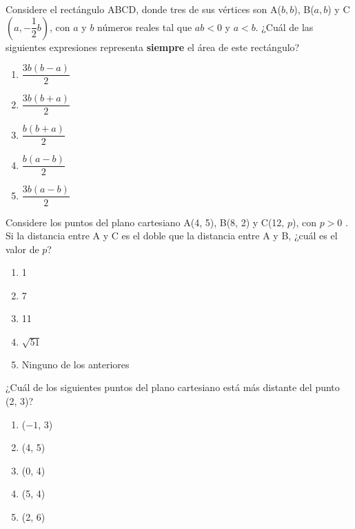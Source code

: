 \begin{enumerate}[label=\large{\textbf{\arabic*.}}, itemsep = 0.15cm, topsep = 0.5cm]
	\parbox{1\linewidth}{ \item Considere el rectángulo ABCD, donde tres de sus vértices son A($b, b$), B($a, b$) y C$\left(a,-\dfrac{1}{2}b\right)$, con $a$ y $b$ números reales tal que $ab<0$ y $a<b$. ¿Cuál de las siguien\-tes expresiones representa \textbf{siempre} el área de este rectángulo? 	
		\begin{enumerate}[label={\Alph*)}, itemsep = 0.15cm, topsep = 0.5cm]
			\item $\dfrac{3b(b-a)}{2}$
			\item $\dfrac{3b(b+a)}{2}$
			\item $\dfrac{b(b+a)}{2}$
			\item $\dfrac{b(a-b)}{2}$
			\item $\dfrac{3b(a-b)}{2}$
	\end{enumerate}}
	
	\parbox{1\linewidth}{ \item Considere los puntos del plano cartesiano A(4, 5), B(8, 2) y C(12, $p$), con $p>0$ . Si la distancia entre A y C es el doble que la distancia entre A y B, ¿cuál es el valor de $p$? 
		
		\begin{enumerate}[label={\Alph*)}, itemsep = 0.15cm, topsep = 0.5cm]
			\item 1
			\item 7
			\item 11
			\item $\sqrt{51}$
			\item Ninguno de los anteriores
	\end{enumerate}}
	
	
	\parbox{1\linewidth}{ \item ¿Cuál de los siguientes puntos del plano cartesiano está más distante del
		punto (2, 3)? 
		
		\begin{enumerate}[label={\Alph*)}, itemsep = 0.15cm, topsep = 0.5cm]
			\item ($-1$, 3)
			\item (4, 5)
			\item (0, 4)
			\item (5, 4)
			\item (2, 6)
	\end{enumerate}}
	

\end{enumerate}
